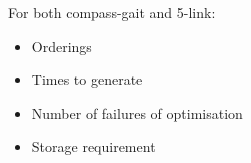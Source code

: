 For both compass-gait and 5-link:
\begin{itemize}
	\item Orderings
	\item Times to generate
	\item Number of failures of optimisation
	\item Storage requirement
\end{itemize}